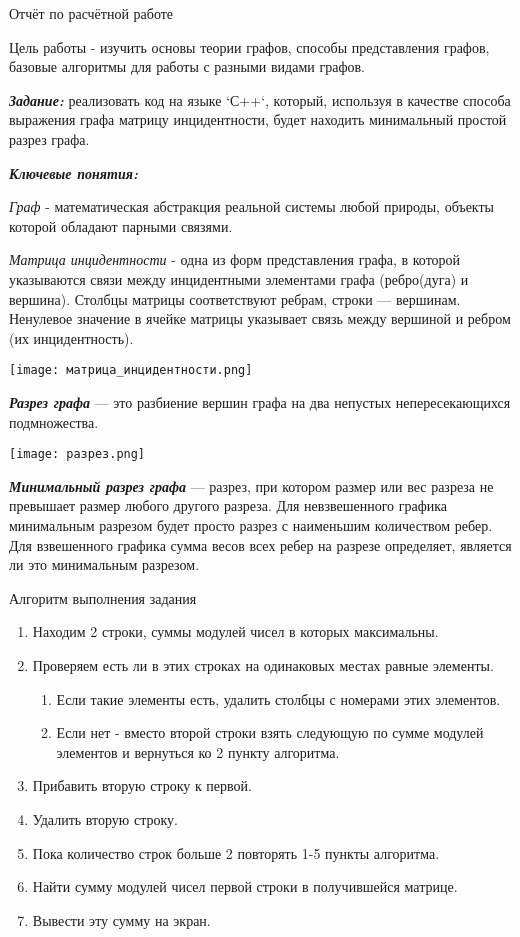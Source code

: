 \documentclass[a4paper,14p]{article}
\begin{document}
\begin{center}
  Отчёт по расчётной работе  
\end{center}

Цель работы - изучить основы теории графов, способы представления графов, базовые алгоритмы для работы с разными видами графов.

\textbf{\textit{Задание:}} реализовать код на языке `С++`, который, используя в качестве способа выражения графа матрицу инцидентности, будет находить минимальный простой разрез графа.

\textbf{\textit{Ключевые понятия:}}

\textit{Граф} - математическая абстракция реальной системы любой природы, объекты которой обладают парными связями.

\textit{Матрица инцидентности} - одна из форм представления графа, в которой указываются связи между инцидентными элементами графа (ребро(дуга) и вершина). Столбцы матрицы соответствуют ребрам, строки — вершинам. Ненулевое значение в ячейке матрицы указывает связь между вершиной и ребром (их инцидентность).

\texttt{[image: матрица\_инцидентности.png]}

\textbf{\textit{Разрез графа}} — это разбиение вершин графа на два непустых непересекающихся подмножества.

\texttt{[image: разрез.png]}

\textbf{\textit{Минимальный разрез графа}} — разрез, при котором размер или вес разреза не превышает размер любого другого разреза. Для невзвешенного графика минимальным разрезом будет просто разрез с наименьшим количеством ребер. Для взвешенного графика сумма весов всех ребер на разрезе определяет, является ли это минимальным разрезом.

\vspace{10pt}
\begin{center}
    \large Алгоритм выполнения задания
\end{center}
\begin{enumerate}
    \item Находим 2 строки, суммы модулей чисел в которых максимальны.
    \item Проверяем есть ли в этих строках на одинаковых местах равные элементы.
    \begin{enumerate}
        \item Если такие элементы есть, удалить столбцы с номерами этих элементов. 
        \item Если нет - вместо второй строки взять следующую по сумме модулей элементов и вернуться ко 2 пункту алгоритма.
    \end{enumerate}
    \item Прибавить вторую строку к первой.
    \item Удалить вторую строку.
    \item Пока количество строк больше 2 повторять 1-5 пункты алгоритма.
    \item Найти сумму модулей чисел первой строки в получившейся матрице.
    \item Вывести эту сумму на экран.
\end{enumerate}
\end{document}
